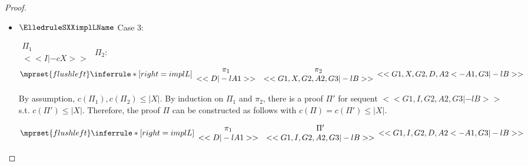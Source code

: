 \begin{proof}
\begin{enumerate}
\begin{itemize}
  \item $\ElledruleSXXimplLName$ Case 3:
      \begin{center}
        \scriptsize
        \begin{math}
          \begin{array}{c}
            \Pi_1 \\
            {<<I |-c X>>}
          \end{array}
        \end{math}
        \qquad\qquad
        $\Pi_2$:
        \begin{math}
          $$\mprset{flushleft}
          \inferrule* [right={\tiny implL}] {
            {
              \begin{array}{cc}
                \pi_1 & \pi_2 \\
                {<<D |-l A1>>} & {<<G1, X, G2, A2, G3 |-l B>>}
              \end{array}
            }
          }{<<G1, X, G2, D, A2 <- A1, G3 |-l B>>}
        \end{math}
      \end{center}
      By assumption, $c(\Pi_1),c(\Pi_2)\leq |X|$. By induction on $\Pi_1$ and $\pi_2$, there is
      a proof $\Pi'$ for sequent $<<G1, I, G2, A2, G3 |-l B>>$ s.t. $c(\Pi') \leq |X|$.
      Therefore, the proof $\Pi$ can be constructed as follows with
      $c(\Pi) = c(\Pi') \leq |X|$.
      \begin{center}
        \scriptsize
        \begin{math}
          $$\mprset{flushleft}
          \inferrule* [right={\tiny implL}] {
            {
              \begin{array}{cc}
                \pi_1 & \Pi' \\
                {<<D |-l A1>>} & {<<G1, I, G2, A2, G3 |-l B>>}
              \end{array}
            }
          }{<<G1, I, G2, D, A2 <- A1, G3 |-l B>>}
        \end{math}
      \end{center}


\end{itemize}
\end{enumerate}
\end{proof}
